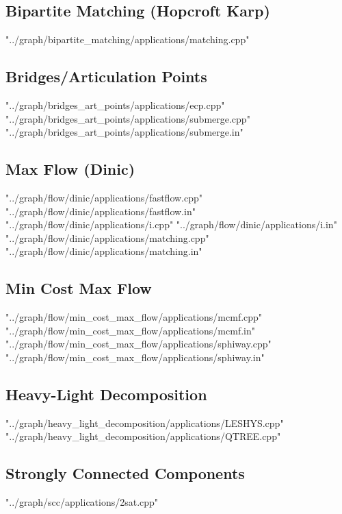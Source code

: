 \documentclass [12pt,onecolumn,oneside]{article}
\begin{document}
\subsection{ Bipartite Matching (Hopcroft Karp)}
 {"../graph/bipartite_matching/applications/matching.cpp"}
\subsection{ Bridges/Articulation Points}
 {"../graph/bridges_art_points/applications/ecp.cpp"}
 {"../graph/bridges_art_points/applications/submerge.cpp"}
 {"../graph/bridges_art_points/applications/submerge.in"}
\subsection{ Max Flow (Dinic)}
 {"../graph/flow/dinic/applications/fastflow.cpp"}
 {"../graph/flow/dinic/applications/fastflow.in"}
 {"../graph/flow/dinic/applications/i.cpp"}
 {"../graph/flow/dinic/applications/i.in"}
 {"../graph/flow/dinic/applications/matching.cpp"}
 {"../graph/flow/dinic/applications/matching.in"}
\subsection{ Min Cost Max Flow}
 {"../graph/flow/min_cost_max_flow/applications/mcmf.cpp"}
 {"../graph/flow/min_cost_max_flow/applications/mcmf.in"}
 {"../graph/flow/min_cost_max_flow/applications/sphiway.cpp"}
 {"../graph/flow/min_cost_max_flow/applications/sphiway.in"}
\subsection{ Heavy-Light Decomposition}
 {"../graph/heavy_light_decomposition/applications/LESHYS.cpp"}
 {"../graph/heavy_light_decomposition/applications/QTREE.cpp"}
\subsection{ Strongly Connected Components}
 {"../graph/scc/applications/2sat.cpp"}
\newpage
\end{document}
